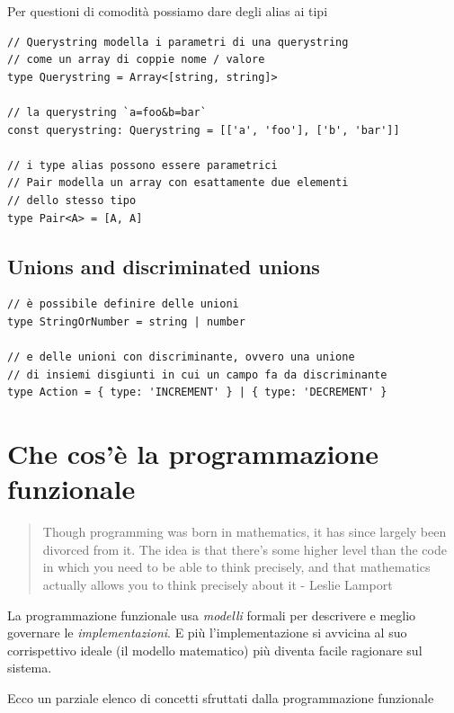\documentclass[12pt]{article}
\begin{document}
Per questioni di comodità possiamo dare degli alias ai tipi

\begin{verbatim}
// Querystring modella i parametri di una querystring
// come un array di coppie nome / valore
type Querystring = Array<[string, string]>

// la querystring `a=foo&b=bar`
const querystring: Querystring = [['a', 'foo'], ['b', 'bar']]

// i type alias possono essere parametrici
// Pair modella un array con esattamente due elementi
// dello stesso tipo
type Pair<A> = [A, A]
\end{verbatim}

\subsection{Unions and discriminated unions}

\begin{verbatim}
// è possibile definire delle unioni
type StringOrNumber = string | number

// e delle unioni con discriminante, ovvero una unione
// di insiemi disgiunti in cui un campo fa da discriminante
type Action = { type: 'INCREMENT' } | { type: 'DECREMENT' }
\end{verbatim}

\newpage

\section{Che cos'è la programmazione funzionale}

\begin{quote}
Though programming was born in mathematics, it has since largely been divorced from it.
The idea is that there's some higher level than the code in which you need to be able to think precisely,
and that mathematics actually allows you to think precisely about it - Leslie Lamport
\end{quote}

La programmazione funzionale usa \emph{modelli} formali per descrivere e meglio governare le \emph{implementazioni}.
E più l'implementazione si avvicina al suo corrispettivo ideale (il modello matematico)
più diventa facile ragionare sul sistema.

Ecco un parziale elenco di concetti sfruttati dalla programmazione funzionale
\end{document}
